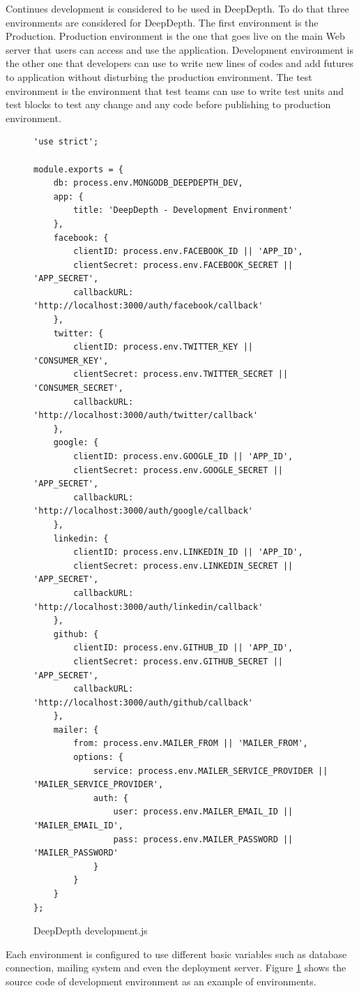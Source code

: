 \documentclass[a4paper,11pt]{report}
\begin{document}
Continues development is considered to be used in DeepDepth. To do that three environments are considered for DeepDepth. The first environment is the Production. Production environment is the one that goes live on the main Web server that users can access and use the application. Development environment is the other one that developers can use to write new lines of codes and add futures to application without disturbing the production environment. The test environment is the environment that test teams can use to write test units and test blocks to test any change and any code before publishing to production environment.

\begin{figure}[!ht]
\caption{DeepDepth development.js}
\begin{lstlisting}
'use strict';

module.exports = {
	db: process.env.MONGODB_DEEPDEPTH_DEV,
	app: {
		title: 'DeepDepth - Development Environment'
	},
	facebook: {
		clientID: process.env.FACEBOOK_ID || 'APP_ID',
		clientSecret: process.env.FACEBOOK_SECRET || 'APP_SECRET',
		callbackURL: 'http://localhost:3000/auth/facebook/callback'
	},
	twitter: {
		clientID: process.env.TWITTER_KEY || 'CONSUMER_KEY',
		clientSecret: process.env.TWITTER_SECRET || 'CONSUMER_SECRET',
		callbackURL: 'http://localhost:3000/auth/twitter/callback'
	},
	google: {
		clientID: process.env.GOOGLE_ID || 'APP_ID',
		clientSecret: process.env.GOOGLE_SECRET || 'APP_SECRET',
		callbackURL: 'http://localhost:3000/auth/google/callback'
	},
	linkedin: {
		clientID: process.env.LINKEDIN_ID || 'APP_ID',
		clientSecret: process.env.LINKEDIN_SECRET || 'APP_SECRET',
		callbackURL: 'http://localhost:3000/auth/linkedin/callback'
	},
	github: {
		clientID: process.env.GITHUB_ID || 'APP_ID',
		clientSecret: process.env.GITHUB_SECRET || 'APP_SECRET',
		callbackURL: 'http://localhost:3000/auth/github/callback'
	},
	mailer: {
		from: process.env.MAILER_FROM || 'MAILER_FROM',
		options: {
			service: process.env.MAILER_SERVICE_PROVIDER || 'MAILER_SERVICE_PROVIDER',
			auth: {
				user: process.env.MAILER_EMAIL_ID || 'MAILER_EMAIL_ID',
				pass: process.env.MAILER_PASSWORD || 'MAILER_PASSWORD'
			}
		}
	}
};
\end{lstlisting}
\label{fig:developmentjs}
\end{figure}

Each environment is configured to use different basic variables such as database connection, mailing system and even the deployment server. Figure \ref{fig:developmentjs} shows the source code of development environment as an example of environments.
\end{document}
